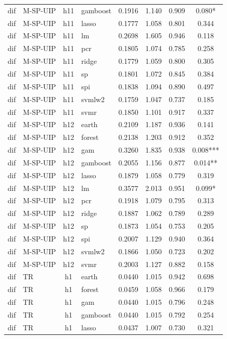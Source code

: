 \begin{ThreePartTable}
\begin{longtable}[t]{llclcccc}
dif & M-SP-UIP & h11 & gamboost & 0.1916 & 1.140 & 0.909 & 0.080*\\
dif & M-SP-UIP & h11 & lasso & 0.1777 & 1.058 & 0.801 & 0.344\\
dif & M-SP-UIP & h11 & lm & 0.2698 & 1.605 & 0.946 & 0.118\\
dif & M-SP-UIP & h11 & pcr & 0.1805 & 1.074 & 0.785 & 0.258\\
dif & M-SP-UIP & h11 & ridge & 0.1779 & 1.059 & 0.800 & 0.305\\
dif & M-SP-UIP & h11 & sp & 0.1801 & 1.072 & 0.845 & 0.384\\
dif & M-SP-UIP & h11 & spi & 0.1838 & 1.094 & 0.890 & 0.497\\
dif & M-SP-UIP & h11 & svmlw2 & 0.1759 & 1.047 & 0.737 & 0.185\\
dif & M-SP-UIP & h11 & svmr & 0.1850 & 1.101 & 0.917 & 0.337\\
\addlinespace
dif & M-SP-UIP & h12 & earth & 0.2109 & 1.187 & 0.936 & 0.141\\
dif & M-SP-UIP & h12 & forest & 0.2138 & 1.203 & 0.912 & 0.352\\
dif & M-SP-UIP & h12 & gam & 0.3260 & 1.835 & 0.938 & 0.008***\\
dif & M-SP-UIP & h12 & gamboost & 0.2055 & 1.156 & 0.877 & 0.014**\\
dif & M-SP-UIP & h12 & lasso & 0.1879 & 1.058 & 0.779 & 0.319\\
dif & M-SP-UIP & h12 & lm & 0.3577 & 2.013 & 0.951 & 0.099*\\
dif & M-SP-UIP & h12 & pcr & 0.1918 & 1.079 & 0.795 & 0.313\\
dif & M-SP-UIP & h12 & ridge & 0.1887 & 1.062 & 0.789 & 0.289\\
dif & M-SP-UIP & h12 & sp & 0.1873 & 1.054 & 0.753 & 0.205\\
dif & M-SP-UIP & h12 & spi & 0.2007 & 1.129 & 0.940 & 0.364\\
dif & M-SP-UIP & h12 & svmlw2 & 0.1866 & 1.050 & 0.723 & 0.202\\
dif & M-SP-UIP & h12 & svmr & 0.2003 & 1.127 & 0.882 & 0.158\\
\addlinespace
dif & TR & h1 & earth & 0.0440 & 1.015 & 0.942 & 0.698\\
dif & TR & h1 & forest & 0.0459 & 1.058 & 0.966 & 0.179\\
dif & TR & h1 & gam & 0.0440 & 1.015 & 0.796 & 0.248\\
dif & TR & h1 & gamboost & 0.0440 & 1.015 & 0.792 & 0.254\\
dif & TR & h1 & lasso & 0.0437 & 1.007 & 0.730 & 0.321\\

\end{longtable}
\end{ThreePartTable}
